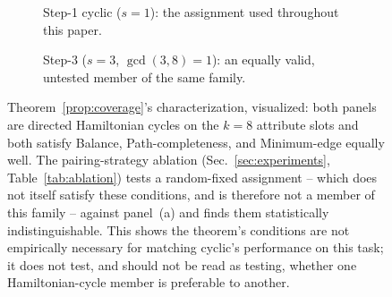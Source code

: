 \documentclass[review]{elsarticle}
\begin{document}
\begin{figure}[t]
\centering
\begin{subfigure}[b]{0.46\linewidth}
\centering
{}
\caption{Step-1 cyclic ($s{=}1$): the assignment used throughout this paper.}
\label{fig:hamiltonian-step1}
\end{subfigure}
\hfill
\begin{subfigure}[b]{0.46\linewidth}
\centering
{}
\caption{Step-3 ($s{=}3$, $\gcd(3,8){=}1$): an equally valid, untested member of the same family.}
\label{fig:hamiltonian-step3}
\end{subfigure}
\caption{Theorem~\ref{prop:coverage}'s characterization, visualized: both panels are directed Hamiltonian cycles on the $k{=}8$ attribute slots and both satisfy Balance, Path-completeness, and Minimum-edge equally well. The pairing-strategy ablation (Sec.~\ref{sec:experiments}, Table~\ref{tab:ablation}) tests a random-fixed assignment -- which does not itself satisfy these conditions, and is therefore not a member of this family -- against panel~(a) and finds them statistically indistinguishable. This shows the theorem's conditions are not empirically necessary for matching cyclic's performance on this task; it does not test, and should not be read as testing, whether one Hamiltonian-cycle member is preferable to another.}
\label{fig:hamiltonian}
\end{figure}
\end{document}
